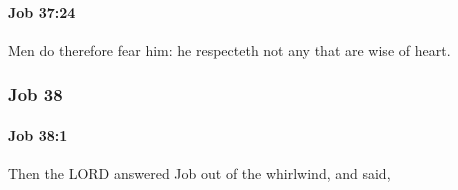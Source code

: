 		\paragraph{Job 37:24} %
			\label{JOB-37-24}

			Men do therefore fear him: he respecteth not any that are wise of heart.

	\subsubsection{Job 38} %
		\label{JOB-38}

		\paragraph{Job 38:1} %
			\label{JOB-38-1}

			Then the LORD answered Job out of the whirlwind, and said,


